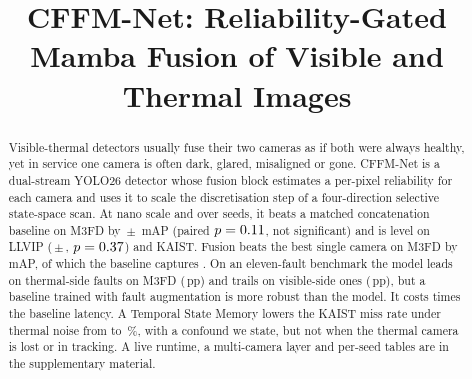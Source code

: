 \documentclass{bmvc2k}
\title{CFFM-Net: Reliability-Gated Mamba Fusion of Visible and Thermal Images}
\begin{document}
\maketitle

\begin{abstract}
Visible-thermal detectors usually fuse their two cameras as if both were always healthy, yet in service one camera is often dark, glared, misaligned or gone. CFFM-Net is a dual-stream YOLO26 detector whose fusion block estimates a per-pixel reliability for each camera and uses it to scale the discretisation step of a four-direction selective state-space scan. At nano scale and over \resLlvipCffmVtwoSeedCount{} seeds, it beats a matched concatenation baseline on M3FD by \marMfdVtwoVsConcatMdMeanMap{}\,$\pm$\,\marMfdVtwoVsConcatMdStdMap{} mAP (paired $p=0.11{}$, not significant) and is level on LLVIP (\marLlvipVtwoVsConcatMdMeanMap{}\,$\pm$\,\marLlvipVtwoVsConcatMdStdMap{}, $p=0.37{}$) and KAIST. Fusion beats the best single camera on M3FD by \gainMfdCffmVtwoOverBestMeanMap{}\,mAP, of which the baseline captures \gainMfdConcatMdOverBestMeanMap{}. On an eleven-fault benchmark the model leads on thermal-side faults on M3FD (\fltMfdMarginMeanThermalAvgSevThreeMap{}\,pp) and trails on visible-side ones (\fltMfdMarginMeanVisibleAvgSevThreeMap{}\,pp), but a baseline trained with fault augmentation is more robust than the model. It costs \latLocalRatioMedian{} times the baseline latency. A Temporal State Memory lowers the KAIST miss rate under thermal noise from \memThermalNoiseImageAllMr{} to \memThermalNoiseMemoryAllMr{}\,\%, with a confound we state, but not when the thermal camera is lost or in tracking. A live runtime, a multi-camera layer and per-seed tables are in the supplementary material.
\end{abstract}




\end{document}
